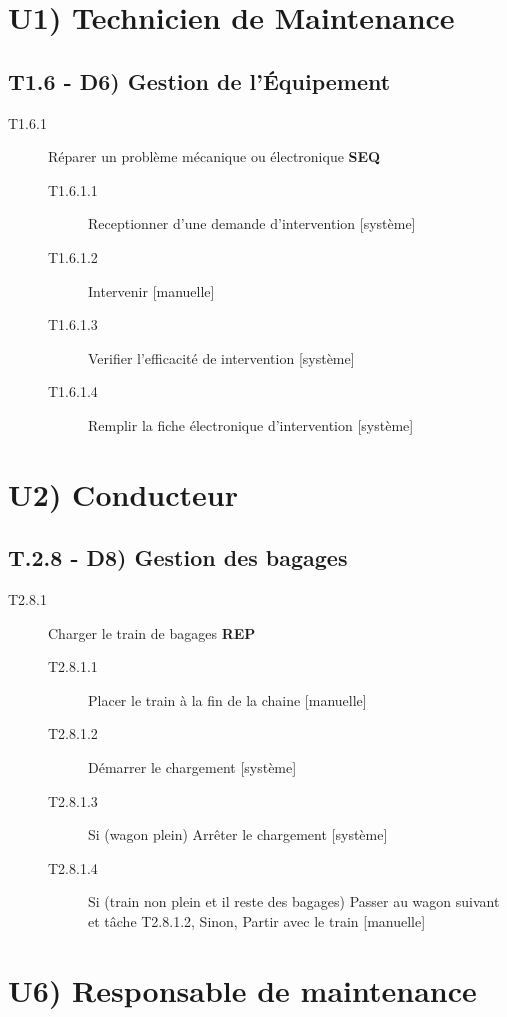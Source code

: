 \section{U1) Technicien de Maintenance}
	\subsection{T1.6 - D6) Gestion de l'Équipement}
	\begin{description}
	\item[T1.6.1] Réparer un problème mécanique ou électronique \textbf{SEQ}
		\begin{description}
		\item[T1.6.1.1] Receptionner d'une demande d'intervention [système]
		\item[T1.6.1.2] Intervenir [manuelle]
		\item[T1.6.1.3] Verifier l'efficacité de intervention [système]
		\item[T1.6.1.4] Remplir la fiche électronique d'intervention [système]
		\end{description}
	\end{description}

\section{U2) Conducteur}
	\subsection{T.2.8 - D8) Gestion des bagages}
	\begin{description}
	\item[T2.8.1] Charger le train de bagages \textbf{REP}
		\begin{description}
		\item[T2.8.1.1] Placer le train à la fin de la chaine [manuelle]
		\item[T2.8.1.2] Démarrer le chargement [système]
		\item[T2.8.1.3] Si (wagon plein) Arrêter le chargement [système]
		\item[T2.8.1.4] Si (train non plein et il reste des bagages) Passer au wagon
		suivant et tâche T2.8.1.2, Sinon, Partir avec le train [manuelle]
		\end{description}
	\end{description}
	
\section{U6) Responsable de maintenance}

